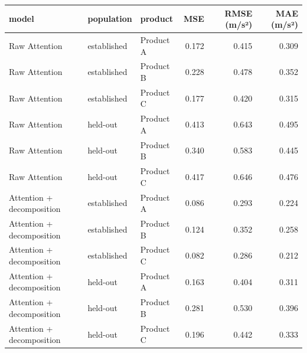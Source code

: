 \begin{tabular}{lllrrr}
\toprule
model & population & product & MSE & RMSE (m/s²) & MAE (m/s²) \\
\midrule
Raw Attention & established & Product A & 0.172 & 0.415 & 0.309 \\
Raw Attention & established & Product B & 0.228 & 0.478 & 0.352 \\
Raw Attention & established & Product C & 0.177 & 0.420 & 0.315 \\
Raw Attention & held-out & Product A & 0.413 & 0.643 & 0.495 \\
Raw Attention & held-out & Product B & 0.340 & 0.583 & 0.445 \\
Raw Attention & held-out & Product C & 0.417 & 0.646 & 0.476 \\
Attention + decomposition & established & Product A & 0.086 & 0.293 & 0.224 \\
Attention + decomposition & established & Product B & 0.124 & 0.352 & 0.258 \\
Attention + decomposition & established & Product C & 0.082 & 0.286 & 0.212 \\
Attention + decomposition & held-out & Product A & 0.163 & 0.404 & 0.311 \\
Attention + decomposition & held-out & Product B & 0.281 & 0.530 & 0.396 \\
Attention + decomposition & held-out & Product C & 0.196 & 0.442 & 0.333 \\
\bottomrule
\end{tabular}
